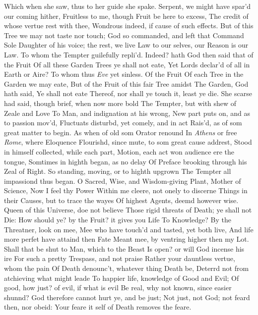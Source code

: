 \documentclass[11pt]{book}
\begin{document}
Which when she saw, thus to her guide she spake. 
\quad Serpent, we might have spar'd our coming hither, 
Fruitless to me, though Fruit be here to excess, 
The credit of whose vertue rest with thee, 
Wondrous indeed, if cause of such effects. 
But of this Tree we may not taste nor touch; 
God so commanded, and left that Command 
Sole Daughter of his voice; the rest, we live 
Law to our selves, our Reason is our Law. 
\quad To whom the Tempter guilefully repli'd. 
Indeed? hath God then said that of the Fruit 
Of all these Garden Trees ye shall not eate, 
Yet Lords declar'd of all in Earth or Aire? 
\quad To whom thus \textit{Eve} yet sinless.  Of the Fruit 
Of each Tree in the Garden we may eate, 
But of the Fruit of this fair Tree amidst 
The Garden, God hath said, Ye shall not eate 
Thereof, nor shall ye touch it, least ye die. 
\quad She scarse had said, though brief, when now more bold 
The Tempter, but with shew of Zeale and Love 
To Man, and indignation at his wrong, 
New part puts on, and as to passion mov'd, 
Fluctuats disturbd, yet comely, and in act 
Rais'd, as of som great matter to begin. 
As when of old som Orator renound 
In \textit{Athens} or free \textit{Rome}, where Eloquence 
Flourishd, since mute, to som great cause addrest, 
Stood in himself collected, while each part, 
Motion, each act won audience ere the tongue, 
Somtimes in highth began, as no delay 
Of Preface brooking through his Zeal of Right. 
So standing, moving, or to highth upgrown 
The Tempter all impassiond thus began. 
\quad O Sacred, Wise, and Wisdom-giving Plant, 
Mother of Science, Now I feel thy Power 
Within me cleere, not onely to discerne 
Things in their Causes, but to trace the wayes 
Of highest Agents, deemd however wise. 
Queen of this Universe, doe not believe 
Those rigid threats of Death; ye shall not Die: 
How should ye? by the Fruit? it gives you Life 
To Knowledge?  By the Threatner, look on mee, 
Mee who have touch'd and tasted, yet both live, 
And life more perfet have attaind then Fate 
Meant mee, by ventring higher then my Lot. 
Shall that be shut to Man, which to the Beast 
Is open? or will God incense his ire 
For such a pretty Trespass, and not praise 
Rather your dauntless vertue, whom the pain 
Of Death denounc't, whatever thing Death be, 
Deterrd not from atchieving what might leade 
To happier life, knowledge of Good and Evil; 
Of good, how just? of evil, if what is evil 
Be real, why not known, since easier shunnd? 
God therefore cannot hurt ye, and be just; 
Not just, not God; not feard then, nor obeid: 
Your feare it self of Death removes the feare. 
\end{document}
